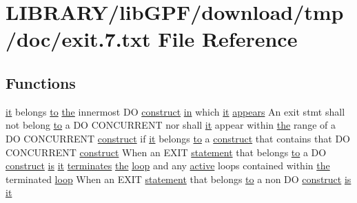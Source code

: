 \hypertarget{exit_87_8txt}{}\section{L\+I\+B\+R\+A\+R\+Y/lib\+G\+P\+F/download/tmp/doc/exit.7.txt File Reference}
\label{exit_87_8txt}
\subsection*{Functions}
\begin{DoxyCompactItemize}
\item 
\hyperlink{what__overview_81_8txt_ada5182f077041a6bc59b37d2cefe9b09}{it} belongs \hyperlink{M__stopwatch_83_8txt_a97209fd3e34ef701c0a9734280779cbb}{to} \hyperlink{M__stopwatch_83_8txt_a0f266597de2e57eb3aa964927bb30e14}{the} innermost DO \hyperlink{exit_87_8txt_aa7ebb4c04e8aa413d646a62e1f67fb5c}{construct} \hyperlink{M__journal_83_8txt_afce72651d1eed785a2132bee863b2f38}{in} which \hyperlink{what__overview_81_8txt_ada5182f077041a6bc59b37d2cefe9b09}{it} \hyperlink{exit_87_8txt_a66fa619682984d2d9673755b5015add3}{appears} An exit stmt shall not belong \hyperlink{M__stopwatch_83_8txt_a97209fd3e34ef701c0a9734280779cbb}{to} a DO C\+O\+N\+C\+U\+R\+R\+E\+NT nor shall \hyperlink{what__overview_81_8txt_ada5182f077041a6bc59b37d2cefe9b09}{it} appear within \hyperlink{M__stopwatch_83_8txt_a0f266597de2e57eb3aa964927bb30e14}{the} range of a DO C\+O\+N\+C\+U\+R\+R\+E\+NT \hyperlink{exit_87_8txt_aa7ebb4c04e8aa413d646a62e1f67fb5c}{construct} if \hyperlink{what__overview_81_8txt_ada5182f077041a6bc59b37d2cefe9b09}{it} belongs \hyperlink{M__stopwatch_83_8txt_a97209fd3e34ef701c0a9734280779cbb}{to} a \hyperlink{exit_87_8txt_aa7ebb4c04e8aa413d646a62e1f67fb5c}{construct} that contains that DO C\+O\+N\+C\+U\+R\+R\+E\+NT \hyperlink{exit_87_8txt_aa7ebb4c04e8aa413d646a62e1f67fb5c}{construct} When an E\+X\+IT \hyperlink{M__stopwatch_83_8txt_a43758526aa61bbaa49faf1e287658350}{statement} that belongs \hyperlink{M__stopwatch_83_8txt_a97209fd3e34ef701c0a9734280779cbb}{to} a DO \hyperlink{exit_87_8txt_aa7ebb4c04e8aa413d646a62e1f67fb5c}{construct} \hyperlink{intro__blas1_83_8txt_a42a91df93f840595de3019ceb5d1df23}{is} \hyperlink{what__overview_81_8txt_ada5182f077041a6bc59b37d2cefe9b09}{it} \hyperlink{do_87_8txt_aaa6a96bc95c5da31cfe2ec4f94db576c}{terminates} \hyperlink{M__stopwatch_83_8txt_a0f266597de2e57eb3aa964927bb30e14}{the} \hyperlink{continue_87_8txt_a5094e6a64d1227c84a0bf4db8f6c3788}{loop} and any \hyperlink{do_87_8txt_a3300b8e9ebbb88612226328b1b2fd93f}{active} loops contained within \hyperlink{M__stopwatch_83_8txt_a0f266597de2e57eb3aa964927bb30e14}{the} terminated \hyperlink{continue_87_8txt_a5094e6a64d1227c84a0bf4db8f6c3788}{loop} When an E\+X\+IT \hyperlink{M__stopwatch_83_8txt_a43758526aa61bbaa49faf1e287658350}{statement} that belongs \hyperlink{M__stopwatch_83_8txt_a97209fd3e34ef701c0a9734280779cbb}{to} a non DO \hyperlink{exit_87_8txt_aa7ebb4c04e8aa413d646a62e1f67fb5c}{construct} \hyperlink{intro__blas1_83_8txt_a42a91df93f840595de3019ceb5d1df23}{is} \hyperlink{what__overview_81_8txt_ada5182f077041a6bc59b37d2cefe9b09}{it} 
\end{DoxyCompactItemize}
